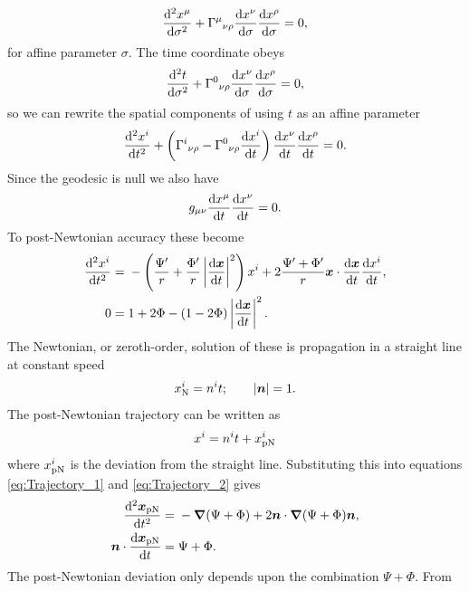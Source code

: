 \begin{equation}
\frac{\mathrm{d}^2 {x^\mu}}{\mathrm{d} {\sigma}^2} + {\Gamma^\mu}_{\nu\rho}\frac{\mathrm{d} {x^\nu}}{\mathrm{d} {\sigma}}\frac{\mathrm{d} {x^\rho}}{\mathrm{d} {\sigma}} = 0,
\label{eq:Geodesic}
\end{equation}
for affine parameter $\sigma$. The time coordinate obeys
\begin{equation}
\frac{\mathrm{d}^2 {t}}{\mathrm{d} {\sigma}^2} + {\Gamma^0}_{\nu\rho}\frac{\mathrm{d} {x^\nu}}{\mathrm{d} {\sigma}}\frac{\mathrm{d} {x^\rho}}{\mathrm{d} {\sigma}} = 0,
\end{equation}
so we can rewrite the spatial components of  using $t$ as an affine parameter \citep[section 6.1]{Will1993}
\begin{equation}
\frac{\mathrm{d}^2 {x^i}}{\mathrm{d} {t}^2} + \left({\Gamma^i}_{\nu\rho} - {\Gamma^0}_{\nu\rho}\frac{\mathrm{d} {x^i}}{\mathrm{d} {t}}\right)\frac{\mathrm{d} {x^\nu}}{\mathrm{d} {t}}\frac{\mathrm{d} {x^\rho}}{\mathrm{d} {t}} = 0.
\end{equation}
Since the geodesic is null we also have
\begin{equation}
g_{\mu\nu}\frac{\mathrm{d} {x^\mu}}{\mathrm{d} {t}}\frac{\mathrm{d} {x^\nu}}{\mathrm{d} {t}} = 0.
\end{equation}
To post-Newtonian accuracy these become
\begin{align}
\label{eq:Trajectory_1}
\frac{\mathrm{d}^2 {x^i}}{\mathrm{d} {t}^2} = {} & -\left(\frac{\Psi'}{r} + \frac{\Phi'}{r}\left|\frac{\mathrm{d} {\boldsymbol{x}}}{\mathrm{d} {t}}\right|^2\right)x^i + 2\frac{\Psi' + \Phi'}{r}\boldsymbol{x}\cdot\frac{\mathrm{d} {\boldsymbol{x}}}{\mathrm{d} {t}}\frac{\mathrm{d} {x^i}}{\mathrm{d} {t}}, \\
0 = {} & 1 + 2\Phi - \left(1 - 2\Phi\right)\left|\frac{\mathrm{d} {\boldsymbol{x}}}{\mathrm{d} {t}}\right|^2.
\label{eq:Trajectory_2}
\end{align}
The Newtonian, or zeroth-order, solution of these is propagation in a straight line at constant speed \citep[section 6.1]{Will1993}
\begin{equation}
x^i_\mathrm{N} = n^it; \qquad |\boldsymbol{n}| = 1.
\end{equation}
The post-Newtonian trajectory can be written as
\begin{equation}
x^i = n^it + x^i_\mathrm{pN}
\end{equation}
where $x^i_\mathrm{pN}$ is the deviation from the straight line. Substituting this into equations \eqref{eq:Trajectory_1} and \eqref{eq:Trajectory_2} gives
\begin{align}
\frac{\mathrm{d}^2 {\boldsymbol{x}_\mathrm{pN}}}{\mathrm{d} {t}^2} = {} & -\boldsymbol{\nabla}(\Psi + \Phi) + 2\boldsymbol{n}\cdot\boldsymbol{\nabla}(\Psi + \Phi)\boldsymbol{n}, \\
\boldsymbol{n}\cdot\frac{\mathrm{d} {\boldsymbol{x}_\mathrm{pN}}}{\mathrm{d} {t}} = {} & \Psi + \Phi.
\end{align}
The post-Newtonian deviation only depends upon the combination $\Psi + \Phi$. From 
